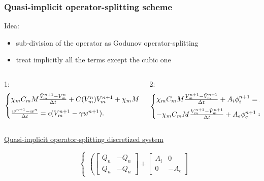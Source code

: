 \documentclass[8pt]{beamer}
\begin{document}
\begin{frame}
\frametitle{Quasi-implicit operator-splitting scheme}
Idea:
\begin{itemize}
\item sub-division of the operator as Godunov operator-splitting
\item treat implicitly all the terms except the cubic one
\end{itemize}
\vspace{2mm}
\begin{columns}
            \begin{column}{0.5\textwidth}
\small 1:
 \begin{equation*}
\begin{cases}
\chi_m C_m M \frac{\tilde{V}_m^{n+1}-V_m^n}{\Delta t} +  C(V_m^n) V_m^{n+1} + \chi_m M w^{n+1}= 0,\vspace{2mm}\\
\frac{w^{n+1} - w^n}{\Delta t} = \epsilon (V_m^{n+1}-\gamma w^{n+1}).
\end{cases}
\end{equation*}
            \end{column}
            \hspace{1cm}
            \begin{column}{0.5\textwidth}  
            \small 2:
\begin{equation*}
\begin{cases}
\chi_m C_m M \frac{V_m^{n+1}-\tilde{V}_m^{n+1}}{\Delta t} + A_i \phi_i^{n+1}= F_i^{n+1},\vspace{2mm}\\
- \chi_m C_m M \frac{V_m^{n+1}-\tilde{V}_m^{n+1}}{\Delta t} + A_e \phi_e^{n+1}= F_e^{n+1}.
\end{cases}
\end{equation*}
            \end{column}
     \end{columns}
\vspace{3mm}
\begin{center}
\underline{Quasi-implicit operator-splitting discretized system}
\end{center}
\begin{equation*}
\quad
\begin{cases}
\left(
\begin{bmatrix} Q_n & -Q_n \\ Q_n & -Q_n \end{bmatrix} + 
\begin{bmatrix} A_i & 0 \\ 0 & -A_e\end{bmatrix}

\end{cases}
\end{equation*}
\end{frame}
\end{document}
